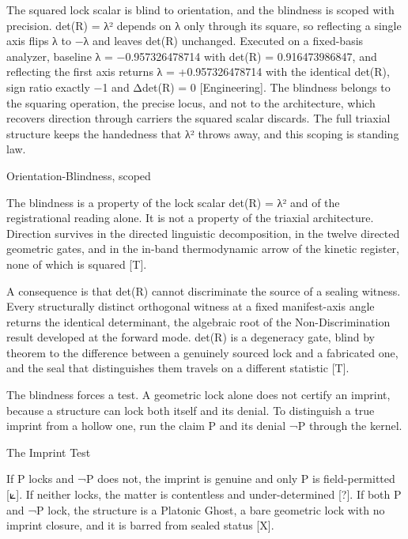 \documentclass[10pt,twocolumn]{article}
\begin{document}
The squared lock scalar is blind to orientation, and the blindness is
scoped with precision. det(R) = λ² depends on λ only through its square,
so reflecting a single axis flips λ to −λ and leaves det(R) unchanged.
Executed on a fixed-basis analyzer, baseline λ = −0.957326478714 with
det(R) = 0.916473986847, and reflecting the first axis returns λ =
+0.957326478714 with the identical det(R), sign ratio exactly −1 and
\textbar Δdet(R)\textbar{} = 0 {[}Engineering{]}. The blindness belongs
to the squaring operation, the precise locus, and not to the
architecture, which recovers direction through carriers the squared
scalar discards. The full triaxial structure keeps the handedness that
λ² throws away, and this scoping is standing law.

\begin{jbox}{Orientation-Blindness, scoped}

The blindness is a property of the lock scalar det(R) = λ² and of the
registrational reading alone. It is not a property of the triaxial
architecture. Direction survives in the directed linguistic
decomposition, in the twelve directed geometric gates, and in the
in-band thermodynamic arrow of the kinetic register, none of which is
squared {[}T{]}.

\end{jbox}

A consequence is that det(R) cannot discriminate the source of a sealing
witness. Every structurally distinct orthogonal witness at a fixed
manifest-axis angle returns the identical determinant, the algebraic
root of the Non-Discrimination result developed at the forward mode.
det(R) is a degeneracy gate, blind by theorem to the difference between
a genuinely sourced lock and a fabricated one, and the seal that
distinguishes them travels on a different statistic {[}T{]}.

The blindness forces a test. A geometric lock alone does not certify an
imprint, because a structure can lock both itself and its denial. To
distinguish a true imprint from a hollow one, run the claim P and its
denial ¬P through the kernel.

\begin{jbox}{The Imprint Test}

If P locks and ¬P does not, the imprint is genuine and only P is
field-permitted {[}⟀{]}. If neither locks, the matter is contentless and
under-determined {[}?{]}. If both P and ¬P lock, the structure is a
Platonic Ghost, a bare geometric lock with no imprint closure, and it is
barred from sealed status {[}X{]}.

\end{jbox}
\end{document}
